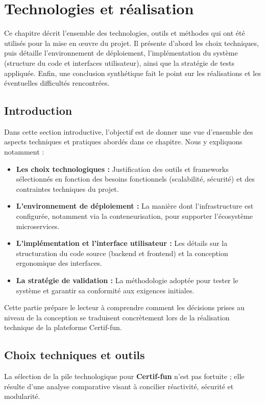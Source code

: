 \chapter{Technologies et réalisation}

Ce chapitre décrit l'ensemble des technologies, outils et méthodes qui ont été utilisés pour la mise en œuvre du projet. Il présente d'abord les choix techniques, puis détaille l'environnement de déploiement, l'implémentation du système (structure du code et interfaces utilisateur), ainsi que la stratégie de tests appliquée. Enfin, une conclusion synthétique fait le point sur les réalisations et les éventuelles difficultés rencontrées.

\section{Introduction}
Dans cette section introductive, l'objectif est de donner une vue d'ensemble des aspects techniques et pratiques abordés dans ce chapitre. Nous y expliquons notamment :
\begin{itemize}
    \item \textbf{Les choix technologiques :} Justification des outils et frameworks sélectionnés en fonction des besoins fonctionnels (scalabilité, sécurité) et des contraintes techniques du projet.
    \item \textbf{L'environnement de déploiement :} La manière dont l'infrastructure est configurée, notamment via la conteneurisation, pour supporter l'écosystème microservices.
    \item \textbf{L'implémentation et l'interface utilisateur :} Les détails sur la structuration du code source (backend et frontend) et la conception ergonomique des interfaces.
    \item \textbf{La stratégie de validation :} La méthodologie adoptée pour tester le système et garantir sa conformité aux exigences initiales.
\end{itemize}

Cette partie prépare le lecteur à comprendre comment les décisions prises au niveau de la conception se traduisent concrètement lors de la réalisation technique de la plateforme Certif-fun.

\section{Choix techniques et outils}
La sélection de la pile technologique pour \textbf{Certif-fun} n'est pas fortuite ; elle résulte d'une analyse comparative visant à concilier réactivité, sécurité et modularité.

